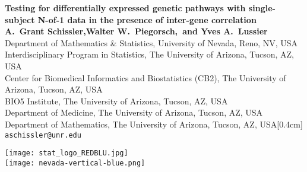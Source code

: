 \documentclass[a0,portrait]{a0poster}
\begin{document}


\begin{minipage}[b]{0.75\linewidth}
\VeryHuge \color{NavyBlue} \textbf{Testing for differentially expressed genetic pathways with single-subject N-of-1 data in the presence of inter-gene correlation} \color{Black}\\ %
\huge \textbf{A.~Grant Schissler,Walter W.~Piegorsch,~and Yves A.~Lussier}\\[0.5cm] %
\huge Department of Mathematics \& Statistics, University of Nevada, Reno, NV, USA\\[0.4cm] %
\huge Interdisciplinary Program in Statistics, The University of Arizona, Tucson, AZ, USA\\[0.4cm]
\huge Center for Biomedical Informatics and Biostatistics (CB2), The University of Arizona, Tucson, AZ, USA\\[0.4cm]
\huge BIO5 Institute, The University of Arizona, Tucson, AZ, USA\\[0.4cm]
\huge Department of Medicine, The University of Arizona, Tucson, AZ, USA\\[0.4cm]
\huge Department of Mathematics, The University of Arizona, Tucson, AZ, USA[0.4cm]
\Large \texttt{aschissler@unr.edu}\\
\end{minipage}
%
\begin{minipage}[b]{0.25\linewidth}
  \texttt{[image: stat\_logo\_REDBLU.jpg]}\\
  \texttt{[image: nevada-vertical-blue.png]}\\
\end{minipage}

\vspace{1cm} %

\end{document}
